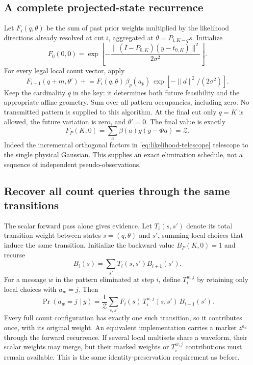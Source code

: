 \documentclass[10pt,a4paper]{article}
\begin{document}
\clearpage
\subsection{A complete projected-state recurrence}
Let $F_i(q,\theta)$ be the sum of past prior weights multiplied by the likelihood directions already resolved
at cut $i$, aggregated at $\theta=P_{i,K-q}s$. Initialize
\[
 F_0(0,0)=\exp\!\left[-\frac{\|(I-P_{0,K})(y-t_{0,K})\|^2}{2\sigma^2}\right].
\]
For every legal local count vector, apply
\begin{equation}
 F_{i+1}(q+m,\theta')\mathrel{+}=
 F_i(q,\theta)\,\beta_p(a_p)\,
              \exp[-\|d\|^2/(2\sigma^2)].
 \label{eq:projected-forward}
\end{equation}
Keep the cardinality $q$ in the key: it determines both future feasibility and the appropriate affine geometry.
Sum over all pattern occupancies, including zero. No transmitted pattern is supplied to this algorithm.
At the final cut only $q=K$ is allowed, the future variation is zero, and $\theta'=0$.
The final value is exactly
\[
 F_P(K,0)=\sum_a\beta(a)g(y-\Phi a)=\mathcal Z.
\]
Indeed the incremental orthogonal factors in \eqref{eq:likelihood-telescope} telescope to the single physical
Gaussian. This supplies an exact elimination schedule, not a sequence of independent pseudo-observations.

\subsection{Recover all count queries through the same transitions}
The scalar forward pass alone gives evidence. Let $T_i(s,s')$ denote its total transition weight between
states $s=(q,\theta)$ and $s'$, summing local choices that induce the same transition.
Initialize the backward value $B_P(K,0)=1$ and recurse
\[
 B_i(s)=\sum_{s'}T_i(s,s')B_{i+1}(s').
\]
For a message $w$ in the pattern eliminated at step $i$, define $T_i^{w,j}$ by retaining only local choices
with $a_w=j$. Then
\begin{equation}
 \boxed{\Pr(a_w=j\mid y)=
 \frac{1}{\mathcal Z}\sum_{s,s'}F_i(s)\,T_i^{w,j}(s,s')\,B_{i+1}(s').}
 \label{eq:frontier-count-query}
\end{equation}
Every full count configuration has exactly one such transition, so it contributes once, with its original weight.
An equivalent implementation carries a marker $z^{a_w}$ through the forward recurrence.
If several local multisets share a waveform, their scalar weights may merge, but their marked weights or
$T_i^{w,j}$ contributions must remain available. This is the same identity-preservation requirement as before.
\end{document}
